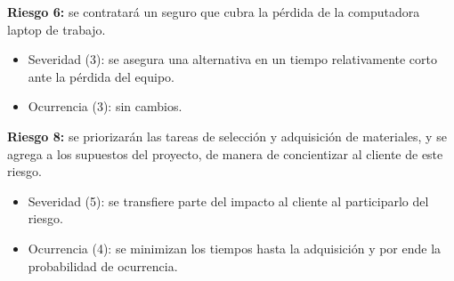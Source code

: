 \documentclass[
11pt, %
codirector, %
]{charter}
\begin{document}
\textbf{Riesgo 6:} se contratará un seguro que cubra la pérdida de la computadora laptop de trabajo.
  \begin{itemize}
		\item Severidad (3): se asegura una alternativa en un tiempo relativamente corto ante la pérdida del equipo.
		\item Ocurrencia (3): sin cambios.
		\end{itemize}
		
\textbf{Riesgo 8:} se priorizarán las tareas de selección y adquisición de materiales, y se agrega a los supuestos del proyecto, de manera de concientizar al cliente de este riesgo.
  \begin{itemize}
		\item Severidad (5): se transfiere parte del impacto al cliente al participarlo del riesgo.
		\item Ocurrencia (4): se minimizan los tiempos hasta la adquisición y por ende la probabilidad de ocurrencia. 
		\end{itemize}
\end{document}
